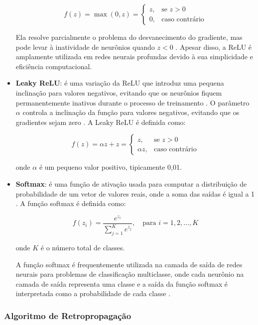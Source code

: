 \begin{itemize}
    \[
    f(z) = \max(0, z) =
    \begin{cases}
        z, & \text{se } z > 0 \\
        0, & \text{caso contrário}
    \end{cases}
    \]

    Ela resolve parcialmente o problema do desvanecimento do gradiente, mas pode levar à inatividade de neurônios quando $z < 0$ \citep{Dubey2022}. Apesar disso, a ReLU é amplamente utilizada em redes neurais profundas devido à sua simplicidade e eficiência computacional.

    \item \textbf{Leaky ReLU}: é uma variação da ReLU que introduz uma pequena inclinação para valores negativos, evitando que os neurônios fiquem permanentemente inativos durante o processo de treinamento \citep{Maas2013}. O parâmetro $\alpha$ controla a inclinação da função para valores negativos, evitando que os gradientes sejam zero \citep{nwankpa2018activation}. A Leaky ReLU é definida como:
    
    \[
    f(z) = \alpha z + z =
    \begin{cases}
    z, & \text{se } z > 0 \\
    \alpha z, & \text{caso contrário}
    \end{cases}
    \]

    onde $\alpha$ é um pequeno valor positivo, tipicamente 0{,}01.

    \item \textbf{Softmax}: é uma função de ativação usada para computar a distribuição de probabilidade de um vetor de valores reais, onde a soma das saídas é igual a 1 \citep{nwankpa2018activation}. A função softmax é definida como:
    
    \[
    f(z_i) = \frac{e^{z_i}}{\sum_{j=1}^{K} e^{z_j}}, \quad \text{para } i = 1, 2, \dots, K
    \]

    onde $K$ é o número total de classes.

    A função softmax é frequentemente utilizada na camada de saída de redes neurais para problemas de classificação multiclasse, onde cada neurônio na camada de saída representa uma classe e a saída da função softmax é interpretada como a probabilidade de cada classe \citep{nwankpa2018activation}.

\end{itemize}

\subsubsection{Algoritmo de Retropropagação}

